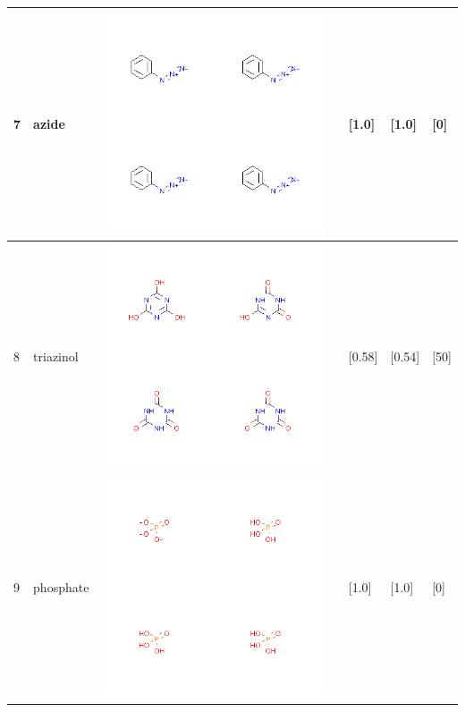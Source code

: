 \begin{longtable}{|l|l|l|l|l|l|l|}
7 & azide & \includegraphics[scale=0.6]{azideCA.png} & & [1.0]& [1.0] & [0] \\
\hline
8 & triazinol & \includegraphics[scale=0.6]{triazinolCA.png} & & [0.58]& [0.54] & [50] \\
\hline
9 & phosphate & \includegraphics[scale=0.6]{phosphateCA.png} & & [1.0]& [1.0] & [0] \\

\end{longtable}
